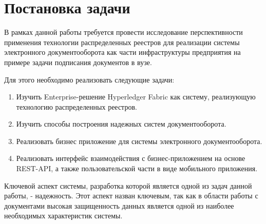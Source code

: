 \section{Постановка задачи} \label{sec:ch1/sec5}
В рамках данной работы требуется провести исследование перспективности применения технологии распределенных реестров для реализации системы электронного документооборота как части инфраструктуры предприятия на примере задачи подписания документов в вузе.

Для этого необходимо реализовать следующие задачи:
\begin{enumerate}
	\item Изучить Enterprise-решение Hyperledger Fabric как систему, реализующую технологию распределенных реестров.
	\item Изучить способы построения надежных систем документооборота.
	\item Реализовать бизнес приложение для системы электронного документооборота.
	\item Реализовать интерфейс взаимодействия с бизнес-приложением на основе REST-API, а также пользовательской части в виде мобильного приложения.
\end{enumerate}

Ключевой аспект системы, разработка которой является одной из задач данной работы, - надежность. Этот аспект назван ключевым, так как в области работы с документами высокая защищенность данных является одной из наиболее необходимых характеристик системы.